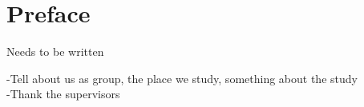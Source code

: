 \chapter*{Preface}

Needs to be written 

-Tell about us as group, the place we study, something about the study \\
-Thank the supervisors 

\pagebreak